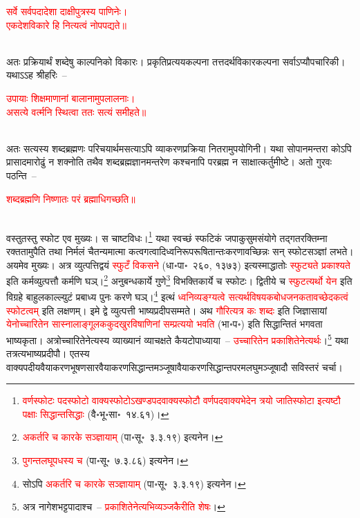 \centering\textcolor{red}{सर्वे सर्वपदादेशा दाक्षीपुत्रस्य पाणिनेः।\nopagebreak\\
एकदेशविकारे हि नित्यत्वं नोपपद्यते॥}\nopagebreak\\
\\
\begin{sloppypar}\justifying\noindent अतः प्रक्रियार्थं शब्देषु काल्पनिको विकारः। प्रकृति\-प्रत्यय\-कल्पना तत्तदर्थ\-विकार\-कल्पना सर्वाऽप्यौपचारिकी। यथाऽऽह श्रीहरिः~–\end{sloppypar}
\centering\textcolor{red}{उपायाः शिक्षमाणानां बालानामुपलालनाः।\nopagebreak\\
असत्ये वर्त्मनि स्थित्वा ततः सत्यं समीहते॥}\nopagebreak\\
\\
\begin{sloppypar}\justifying\noindent अतः सत्यस्य शब्द\-ब्रह्मणः परिचयार्थमसत्याऽपि व्याकरण\-प्रक्रिया नितरामुपयोगिनी। यथा सोपानमन्तरा कोऽपि प्रासादमारोढुं न शक्नोति तथैव शब्द\-ब्रह्म\-ज्ञानमन्तरेण कश्चनापि पर\-ब्रह्म न साक्षात्कर्तुमीष्टे। अतो गुरवः पठन्ति~–\end{sloppypar}
\centering\textcolor{red}{शब्दब्रह्मणि निष्णातः परं ब्रह्माधिगच्छति॥}\nopagebreak\\
\\
\begin{sloppypar}\justifying\noindent\hspace{10mm} वस्तुतस्तु स्फोट एव मुख्यः। स चाष्ट\-विधः।\footnote{\textcolor{red}{वर्णस्फोटः पदस्फोटो वाक्य\-स्फोटोऽखण्ड\-पदवाक्य\-स्फोटौ वर्णपदवाक्य\-भेदेन त्रयो जातिस्फोटा इत्यष्टौ पक्षाः सिद्धान्त\-सिद्धाः} (वै॰भू॰सा॰~१४.६१)।} यथा स्वच्छं स्फटिकं जपाकुसुम\-संयोगे तद्गत\-रक्तिम्ना रक्ततामुपैति तथा निर्मलं चैतन्यमात्मा
कत्व\-गत्वादि\-ध्वनि\-रूप\-रूषितान्तः\-करणावच्छिन्नः सन् स्फोट\-सञ्ज्ञां लभते। अयमेव मुख्यः। अत्र व्युत्पत्ति\-द्वयं \textcolor{red}{स्फुटँ विकसने} (धा॰पा॰~२६०, १३७३) इत्यस्माद्धातोः \textcolor{red}{स्फुट्यते प्रकाश्यते} इति कर्म\-व्युत्पत्तौ कर्मणि घञ्।\footnote{\textcolor{red}{अकर्तरि च कारके सञ्ज्ञायाम्} (पा॰सू॰~३.३.१९) इत्यनेन।} अनुबन्धकार्ये गुणे\footnote{\textcolor{red}{पुगन्त\-लघूपधस्य च} (पा॰सू॰~७.३.८६) इत्यनेन।} विभक्तिकार्ये च स्फोटः। द्वितीये च \textcolor{red}{स्फुटत्यर्थो येन} इति विग्रहे बाहुलकाल्ल्युटं प्रबाध्य पुनः करणे घञ्।\footnote{सोऽपि \textcolor{red}{अकर्तरि च कारके सञ्ज्ञायाम्} (पा॰सू॰~३.३.१९) इत्यनेन।} इत्थं \textcolor{red}{ध्वनि\-व्यङ्ग्यत्वे सत्यर्थ\-विषयक\-बोध\-जनकतावच्छेदकत्वं स्फोटत्वम्} इति लक्षणम्। इमे द्वे व्युत्पत्ती भाष्य\-प्रदीप\-सम्मते। अथ \textcolor{red}{गौरित्यत्र कः शब्दः} इति जिज्ञासायां \textcolor{red}{येनोच्चारितेन सास्ना\-लाङ्गूल\-ककुद\-खुर\-विषाणिनां सम्प्रत्ययो भवति} (भा॰प॰) इति सिद्धान्तितं भगवता भाष्यकृता। अत्रोच्चारितेनेत्यस्य व्याख्यानं व्याचक्षते कैयटोपाध्याया~– \textcolor{red}{उच्चारितेन प्रकाशितेनेत्यर्थः}।\footnote{अत्र नागेशभट्ट\-पादाश्च~– \textcolor{red}{प्रकाशितेनेत्यभि\-व्यञ्जकैरीति शेषः}।} यथा तत्रत्य\-भाष्य\-प्रदीपौ। एतस्य वाक्यपदीय\-वैयाकरण\-भूषण\-सार\-वैयाकरण\-सिद्धान्त\-मञ्जूषा\-वैयाकरण\-सिद्धान्त\-परम\-लघु\-मञ्जूषादौ सविस्तरं चर्चा।\end{sloppypar}
